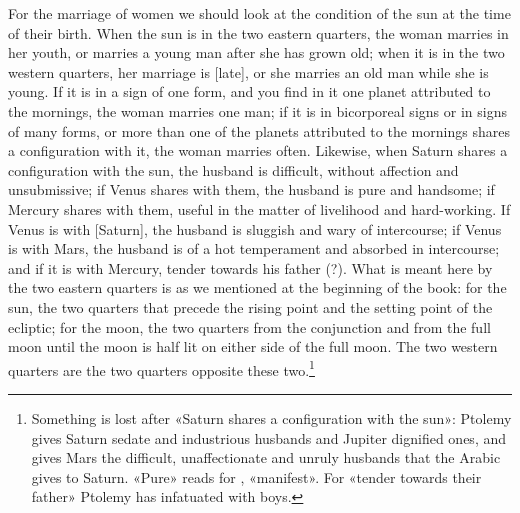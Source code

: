 \documentclass[11pt]{article}
\newcommand{\Fol}[1]{\marginpar{\footnotesize\color{gray}f.\,#1}}
\begin{document}
\par \Fol{68r}For the marriage of women we should look at the condition of the sun at the time of their birth. When the sun is in the two eastern quarters, the woman marries in her youth, or marries a young man after she has grown old; when it is in the two western quarters, her marriage is [late], or she marries an old man while she is young. If it is in a sign of one form, and you find in it one planet attributed to the mornings, the woman marries one man; if it is in bicorporeal signs or in signs of many forms, or more than one of the planets attributed to the mornings shares a configuration with it, the woman marries often. Likewise, when Saturn shares a configuration with the sun, the husband is difficult, without affection and unsubmissive; if Venus shares with them, the husband is pure and handsome; if Mercury shares with them, useful in the matter of livelihood and hard-working. If Venus is with [Saturn], the husband is sluggish and wary of intercourse; if Venus is with Mars, the husband is of a hot temperament and absorbed in intercourse; and if it is with Mercury, tender towards his father (?). What is meant here by the two eastern quarters is as we mentioned at the beginning of the book: for the sun, the two quarters that precede the rising point and the setting point of the ecliptic; for the moon, the two quarters from the conjunction and from the full moon until the moon is half lit on either side of the full moon. The two western quarters are the two quarters opposite these two.\footnote{Something is lost after «Saturn shares a configuration with the sun»: Ptolemy gives Saturn sedate and industrious husbands and Jupiter dignified ones, and gives Mars the difficult, unaffectionate and unruly husbands that the Arabic gives to Saturn. «Pure» reads  for , «manifest». For «tender towards their father» Ptolemy has infatuated with boys.}\par
\end{document}

